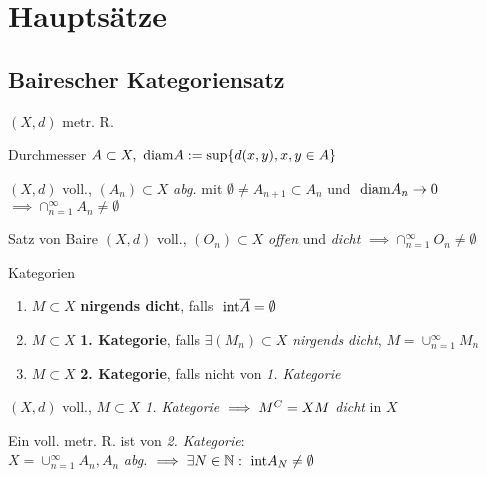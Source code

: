 \section{Hauptsätze}


\subsection{Bairescher Kategoriensatz}
  $(X,d)$ metr. R.

\begin{definition}{Durchmesser}
  $A \subset X,\text{ diam} A := \sup\{d(x,y), x,y\in A\} $
\end{definition}

\begin{lemma}
  $(X,d)$ voll., $(A_n) \subset X$ \textit{abg.} mit
  $\emptyset \neq A_{n+1} \subset A_n$ und $\text{ diam} A_n \to 0$
  $\implies \cap_{n=1}^\infty A_n \neq \emptyset$
\end{lemma}

\begin{satz}{Satz von Baire}
  $(X,d)$ voll., $(O_n) \subset X$ \textit{offen} und \textit{dicht}
  $\implies \cap_{n=1}^\infty O_n \neq \emptyset$
\end{satz}

\begin{definition}{Kategorien}
  \begin{enumerate}[label = (\roman*)]
    \item $M \subset X$ \textbf{nirgends dicht},
      falls $\text{ int} \overline{A} = \emptyset$
    \item $M \subset X$ \textbf{1. Kategorie}, falls $\exists (M_n) \subset X$
      \textit{nirgends dicht}, $M = \cup_{n=1}^\infty M_n$
    \item $M \subset X$ \textbf{2. Kategorie}, falls nicht von
      \textit{1. Kategorie}
  \end{enumerate}
\end{definition}

\begin{korrolar}
  $(X,d)$ voll., $M \subset X$ \textit{1. Kategorie} $\implies M^C = X\\M$
  \textit{dicht} in $X$
\end{korrolar}

\begin{korrolar}
  Ein voll. metr. R. ist von \textit{2. Kategorie}:\\
  $X = \cup_{n=1}^\infty A_n, A_n$ \textit{abg.}
  $\implies \exists N \in \mathbb{N}: \text{ int} A_N \neq \emptyset$
\end{korrolar}


